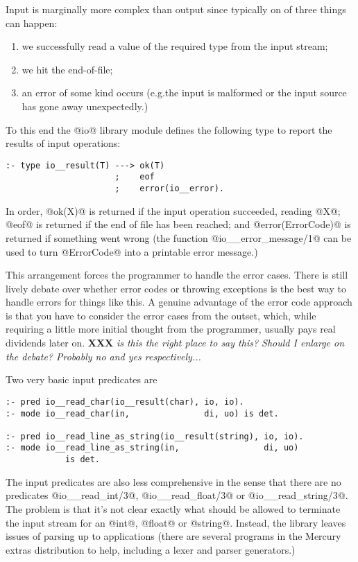 \documentclass[a4paper,11pt,notitlepage,onecolumn]{article}
\makeatletter
\newcommand{\eg}%
{e.g.\@ }
\newcommand{\XXX}[1]%
{{\small\textbf{XXX} \emph{#1}}}
\makeatother
\begin{document}
Input is marginally more complex than output since
typically on of three things can happen:
\begin{enumerate}
\item we successfully read a value of the required type from
  the input stream;
\item we hit the end-of-file;
\item an error of some kind occurs (\eg the input is
  malformed or the input source has gone away unexpectedly.)
\end{enumerate}

To this end the @io@ library module defines the following
type to report the results of input operations:
\begin{verbatim}
:- type io__result(T) ---> ok(T)
                      ;    eof
                      ;    error(io__error).
\end{verbatim}
In order, @ok(X)@ is returned if the input operation
succeeded, reading @X@; @eof@ is returned if the end of file
has been reached; and @error(ErrorCode)@ is returned if
something went wrong (the function @io__error_message/1@ can
be used to turn @ErrorCode@ into a printable error message.)

This arrangement forces the programmer to handle the error
cases.  There is still lively debate over whether error
codes or throwing exceptions is the best way to handle
errors for things like this.  A genuine advantage of the
error code approach is that you have to consider the error
cases from the outset, which, while requiring a little
more initial thought from the programmer, usually pays
real dividends later on.
\XXX{is this the right place to say this?  Should I
enlarge on the debate?  Probably no and yes
respectively...}

Two very basic input predicates are
\begin{verbatim}
:- pred io__read_char(io__result(char), io, io).
:- mode io__read_char(in,               di, uo) is det.

:- pred io__read_line_as_string(io__result(string), io, io).
:- mode io__read_line_as_string(in,                 di, uo)
            is det.
\end{verbatim}

The input predicates are also less comprehensive in the
sense that there are no predicates @io__read_int/3@,
@io__read_float/3@ or @io__read_string/3@.  The problem is
that it's not clear exactly what should be allowed to
terminate the input stream for an @int@, @float@ or @string@.
Instead, the library leaves issues of parsing up to
applications (there are several programs in the Mercury
extras distribution to help, including a lexer and parser
generators.)
\end{document}
